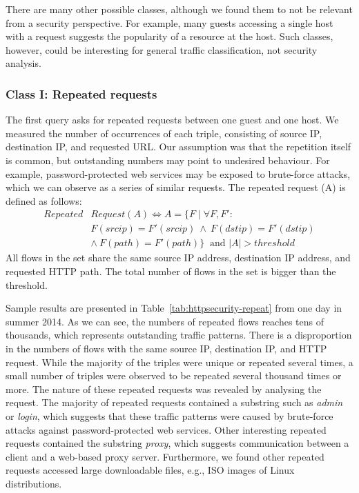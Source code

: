 There are many other possible classes, although we found them to not be relevant from a security perspective. For example, many guests accessing a single host with a request suggests the popularity of a resource at the host. Such classes, however, could be interesting for general traffic classification, not security analysis.

\subsubsection{Class I: Repeated requests}

The first query asks for repeated requests between one guest and one host. We measured the number of occurrences of each triple, consisting of source IP, destination IP, and requested URL. Our assumption was that the repetition itself is common, but outstanding numbers may point to undesired behaviour. For example, password-protected web services may be exposed to brute-force attacks, which we can observe as a series of similar requests. The repeated request (A) is defined as follows:
\begin{equation*}
\begin{split}
Repeated&Request(A) \iff A = \{F \mid \forall F, F':\\
&F(srcip) = F'(srcip) \: \land \: F(dstip) = F'(dstip)\\
&\land \: F(path) = F'(path)\} \: \mbox{ and } |A| > threshold
\end{split}
\end{equation*}
All flows in the set share the same source IP address, destination IP address, and requested HTTP path. The total number of flows in the set is bigger than the threshold.

Sample results are presented in Table~\ref{tab:httpsecurity-repeat} from one day in summer 2014. As we can see, the numbers of repeated flows reaches tens of thousands, which represents outstanding traffic patterns. There is a disproportion in the numbers of flows with the same source IP, destination IP, and HTTP request. While the majority of the triples were unique or repeated several times, a small number of triples were observed to be repeated several thousand times or more. The nature of these repeated requests was revealed by analysing the request. The majority of repeated requests contained a substring such as \textit{admin} or \textit{login}, which suggests that these traffic patterns were caused by brute-force attacks against password-protected web services. Other interesting repeated requests contained the substring \textit{proxy}, which suggests communication between a client and a web-based proxy server. Furthermore, we found other repeated requests accessed large downloadable files, e.g., ISO images of Linux distributions.

